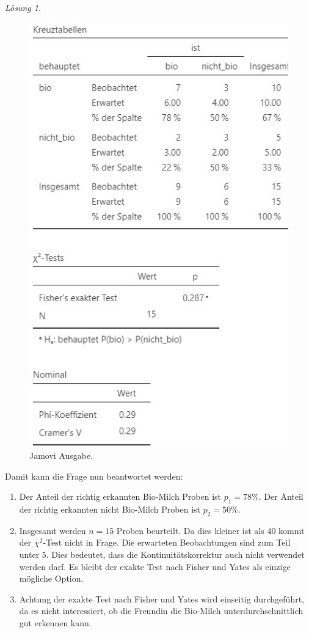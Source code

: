 \documentclass[
]{book}
\providecommand{\tightlist}{%
  \setlength{\itemsep}{0pt}\setlength{\parskip}{0pt}}
\theoremstyle{definition}
\theoremstyle{definition}
\theoremstyle{definition}
\theoremstyle{definition}
\theoremstyle{remark}
\newtheorem*{solution}{Lösung}
\begin{document}
\begin{solution}
\begin{figure}
{\centering \includegraphics{figures/09-exr-bio-milch-jmv-output} 

}

\caption{Jamovi Ausgabe.}\label{fig:sol-bio-milch-output}
\end{figure}

Damit kann die Frage nun beantwortet werden:

\begin{enumerate}
\def\labelenumi{\alph{enumi})}
\tightlist
\item
  Der Anteil der richtig erkannten Bio-Milch Proben ist \(p_1 = 78\%\). Der Anteil der richtig erkannten nicht Bio-Milch Proben ist \(p_2 = 50\%\).
\item
  Insgesamt werden \(n = 15\) Proben beurteilt. Da dies kleiner ist als \(40\) kommt der \(\chi^2\)-Test nicht in Frage. Die erwarteten Beobachtungen sind zum Teil unter \(5\). Dies bedeutet, dass die Kontinuitätskorrektur auch nicht verwendet werden darf. Es bleibt der exakte Test nach Fisher und Yates als einzige mögliche Option.
\item
  Achtung der exakte Test nach Fisher und Yates wird einseitig durchgeführt, da es nicht interessiert, ob die Freundin die Bio-Milch unterdurchschnittlich gut erkennen kann.
\end{enumerate}


\end{solution}
\end{document}
